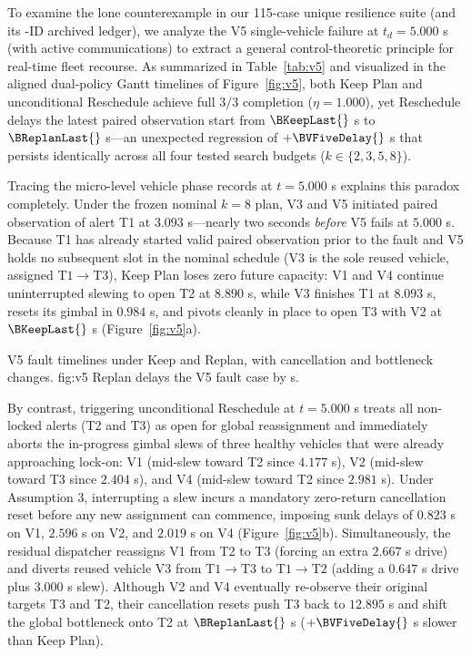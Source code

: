 To examine the lone counterexample in our 115-case unique resilience suite (and its \BCaseCount{}-ID archived ledger), we analyze the V5 single-vehicle failure at $t_d=5.000$ s (with active communications) to extract a general control-theoretic principle for real-time fleet recourse. As summarized in Table~\ref{tab:v5} and visualized in the aligned dual-policy Gantt timelines of Figure~\ref{fig:v5}, both Keep Plan and unconditional Reschedule achieve full $3/3$ completion ($\eta=1.000$), yet Reschedule delays the latest paired observation start from $\BKeepLast{}$ s to $\BReplanLast{}$ s—an unexpected regression of $+\BVFiveDelay{}$ s that persists identically across all four tested search budgets ($k\in\{2,3,5,8\}$).

Tracing the micro-level vehicle phase records at $t=5.000$ s explains this paradox completely. Under the frozen nominal $k=8$ plan, V3 and V5 initiated paired observation of alert T1 at $3.093$ s—nearly two seconds \emph{before} V5 fails at $5.000$ s. Because T1 has already started valid paired observation prior to the fault and V5 holds no subsequent slot in the nominal schedule (V3 is the sole reused vehicle, assigned $\mathrm{T1}\!\to\!\mathrm{T3}$), Keep Plan loses zero future capacity: V1 and V4 continue uninterrupted slewing to open T2 at $8.890$ s, while V3 finishes T1 at $8.093$ s, resets its gimbal in $0.984$ s, and pivots cleanly in place to open T3 with V2 at $\BKeepLast{}$ s (Figure~\ref{fig:v5}a).

{V5 fault timelines under Keep and Replan, with cancellation and bottleneck changes.}
{fig:v5}
{Replan delays the V5 fault case by \BVFiveDelay{} s.}

By contrast, triggering unconditional Reschedule at $t=5.000$ s treats all non-locked alerts (T2 and T3) as open for global reassignment and immediately aborts the in-progress gimbal slews of three healthy vehicles that were already approaching lock-on: V1 (mid-slew toward T2 since $4.177$ s), V2 (mid-slew toward T3 since $2.404$ s), and V4 (mid-slew toward T2 since $2.981$ s). Under Assumption 3, interrupting a slew incurs a mandatory zero-return cancellation reset before any new assignment can commence, imposing sunk delays of $0.823$ s on V1, $2.596$ s on V2, and $2.019$ s on V4 (Figure~\ref{fig:v5}b). Simultaneously, the residual dispatcher reassigns V1 from T2 to T3 (forcing an extra $2.667$ s drive) and diverts reused vehicle V3 from $\mathrm{T1}\!\to\!\mathrm{T3}$ to $\mathrm{T1}\!\to\!\mathrm{T2}$ (adding a $0.647$ s drive plus $3.000$ s slew). Although V2 and V4 eventually re-observe their original targets T3 and T2, their cancellation resets push T3 back to $12.895$ s and shift the global bottleneck onto T2 at $\BReplanLast{}$ s ($+\BVFiveDelay{}$ s slower than Keep Plan).

